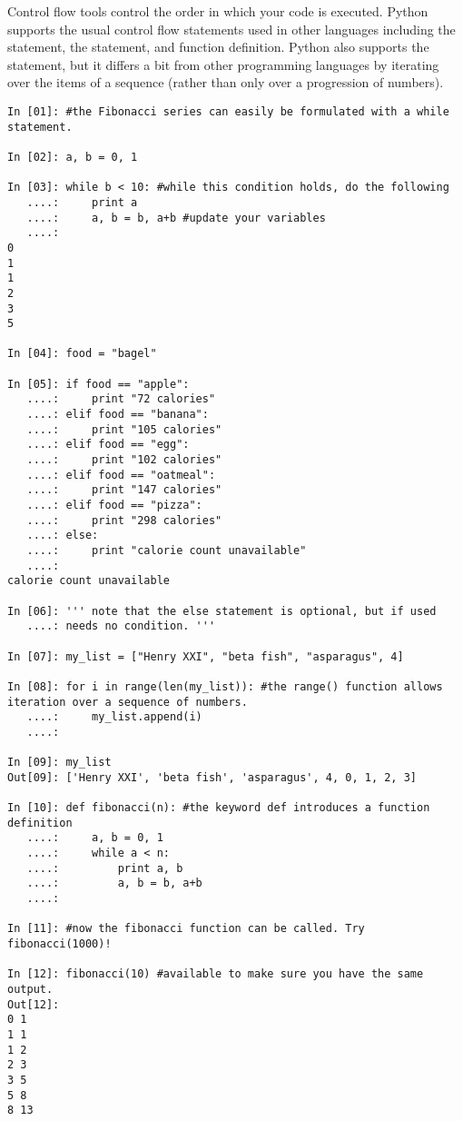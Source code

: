 \begin{example}
Control flow tools control the order in which your code is executed.
Python supports the usual control flow statements used in other languages
including the  statement, the  statement, and function definition. 
Python also supports the  statement, but it differs a bit from other programming languages by iterating over the items of a sequence (rather than only over a progression of numbers).

\begin{lstlisting}
In [01]: #the Fibonacci series can easily be formulated with a while statement.

In [02]: a, b = 0, 1

In [03]: while b < 10: #while this condition holds, do the following
   ....:     print a
   ....:     a, b = b, a+b #update your variables
   ....:     
0
1
1
2
3
5

In [04]: food = "bagel"

In [05]: if food == "apple":
   ....:     print "72 calories"
   ....: elif food == "banana":
   ....:     print "105 calories"
   ....: elif food == "egg":
   ....:     print "102 calories"
   ....: elif food == "oatmeal":
   ....:     print "147 calories"
   ....: elif food == "pizza":
   ....:     print "298 calories"
   ....: else: 
   ....:     print "calorie count unavailable"
   ....:     
calorie count unavailable

In [06]: ''' note that the else statement is optional, but if used
   ....: needs no condition. '''
   
In [07]: my_list = ["Henry XXI", "beta fish", "asparagus", 4]

In [08]: for i in range(len(my_list)): #the range() function allows iteration over a sequence of numbers. 
   ....:     my_list.append(i)
   ....:     

In [09]: my_list
Out[09]: ['Henry XXI', 'beta fish', 'asparagus', 4, 0, 1, 2, 3]

In [10]: def fibonacci(n): #the keyword def introduces a function definition
   ....:     a, b = 0, 1
   ....:     while a < n:
   ....:         print a, b
   ....:         a, b = b, a+b
   ....:         

In [11]: #now the fibonacci function can be called. Try fibonacci(1000)!

In [12]: fibonacci(10) #available to make sure you have the same output.
Out[12]:
0 1
1 1
1 2
2 3
3 5
5 8
8 13

\end{lstlisting}
\end{example}

